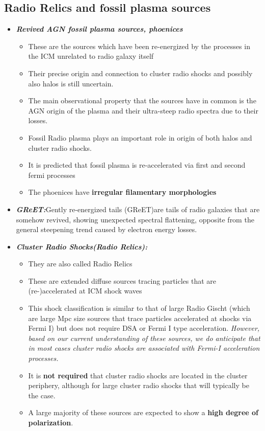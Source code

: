 \documentclass[12pt]{report}
\newcommand{\tbf}[1]{\textbf{#1}}
\newcommand{\tit}[1]{\textit{#1}}
\begin{document}
 \subsection{Radio Relics and fossil plasma sources}
 \begin{itemize}
 \item \tbf{\tit{Revived AGN fossil plasma sources, phoenices}}
 \begin{itemize}
 
\item These are the sources which have been re-energized by the processes in the ICM unrelated to radio galaxy itself
\item Their precise origin and connection to cluster radio shocks and possibly also halos is still uncertain. 
\item The main observational property that the sources have in common is the AGN origin of the plasma and their ultra-steep radio spectra due to their losses.
\item Fossil Radio plasma plays an important role in origin of both halos and cluster radio shocks.
\item It is predicted that fossil plasma is re-accelerated via first and second fermi processes
\item The phoenices have \tbf{irregular filamentary morphologies}
 \end{itemize}
 \item  \tbf{\tit{GReET:}}Gently re-energized tails (GReET)are tails of radio galaxies that are somehow revived, showing unexpected spectral flattening, opposite from the general steepening trend caused by electron energy losses.
 \item \tbf{\tit{Cluster Radio Shocks(Radio Relics):}}
 \begin{itemize}
 \item They are also called Radio Relics
 \item These are  extended diffuse sources tracing particles that are (re-)accelerated at ICM shock waves
 \item This shock classification is similar to that of large Radio Gischt (which  are large Mpc size sources that trace particles accelerated at shocks via Fermi I) but does not require DSA or Fermi I type acceleration. \tit{However, based on our current understanding of these sources, we do anticipate that in most cases cluster radio shocks are associated with Fermi-I acceleration processes.}
 \item It is \tbf{not required} that cluster radio shocks are located in the cluster periphery, although for large cluster radio shocks that will typically be the case. 
 \item A large majority of these sources are expected to show a \tbf{high degree of polarization}. 
 

\end{itemize}
\end{itemize}
\end{document}
